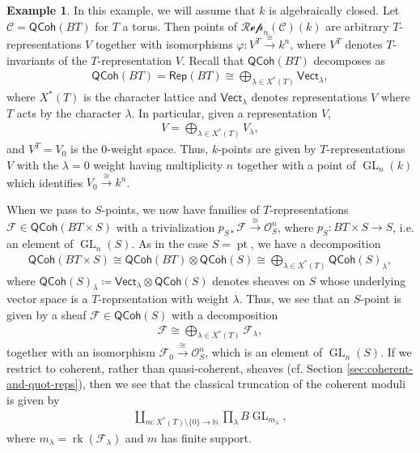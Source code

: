 \documentclass{article}
\numberwithin{equation}{section}
\theoremstyle{quest}
\theoremstyle{definition}
\newtheorem{ex}[thm]{Example}
\theoremstyle{remark}
\DeclareMathOperator{\GL}{GL}
\DeclareMathOperator{\rk}{rk}
\DeclareMathOperator{\pt}{pt}
\begin{document}
\begin{ex}
	In this example, we will assume that $k$ is algebraically closed. Let $\mathcal{C}=\mathsf{QCoh}(BT)$ for $T$ a torus. Then points of $\mathscr{Rep}_n(\mathcal{C})(k)$ are arbitrary $T$-representations $V$ together with isomorphisms $\varphi:V^T\xrightarrow{\cong}k^n$, where $V^T$ denotes $T$-invariants of the $T$-representation $V$. Recall that $\mathsf{QCoh}(BT)$ decomposes as
	\begin{align*}
		\mathsf{QCoh}(BT)=\mathsf{Rep}(BT)\cong \bigoplus _{\lambda\in X^*(T)}\mathsf{Vect}_{\lambda},
	\end{align*} 
	where $X^*(T)$ is the character lattice and $\mathsf{Vect}_{\lambda}$ denotes representations $V$ where $T$ acts by the character $\lambda$. In particular, given a representation $V$,
	\begin{align*}
		V=\bigoplus _{\lambda\in X^*(T)}V_\lambda,
	\end{align*} 
	and $V^T=V_0$ is the 0-weight space. Thus, $k$-points are given by $T$-representations $V$ with the $\lambda=0$ weight having multiplicity $n$ together with a point of $\GL_n(k)$ which identifies $V_0\xrightarrow{\cong} k^n$.

	When we pass to $S$-points, we now have families of $T$-representations $\mathscr{F}\in \mathsf{QCoh}(BT\times S)$ with a trivialization $p_{S*}\mathscr{F}\xrightarrow{\cong}\mathscr{O}^n_S$, where $p_S:BT\times S\to S$, i.e. an element of $\GL_n(S)$. As in the case $S=\pt$, we have a decomposition
	\begin{align*}
		\mathsf{QCoh}(BT\times S)\cong\mathsf{QCoh}(BT)\otimes \mathsf{QCoh}(S)\cong \bigoplus _{\lambda\in X^*(T)}\mathsf{QCoh}(S)_\lambda,
	\end{align*} 
	where $\mathsf{QCoh}(S)_\lambda\coloneqq \mathsf{Vect}_\lambda\otimes \mathsf{QCoh}(S)$ denotes sheaves on $S$ whose underlying vector space is a $T$-reprsentation with weight $\lambda$. Thus, we see that an $S$-point is given by a sheaf $\mathscr{F}\in \mathsf{QCoh}(S)$ with a decomposition
	\begin{align*}
		\mathscr{F}\cong \bigoplus _{\lambda\in X^*(T)}\mathscr{F}_\lambda,
	\end{align*} 
	together with an isomorphism $\mathscr{F}_0\xrightarrow{\cong}\mathscr{O}^n_{S}$, which is an element of $\GL_n(S)$. If we restrict to coherent, rather than quasi-coherent, sheaves (cf. Section \ref{sec:coherent-and-quot-reps}), then we see that the classical truncation of the coherent moduli is given by
	\begin{align*}
		\coprod_{m:X^*(T)\setminus \{0\} \to \mathbb{N} }\prod_{\lambda }B\GL_{m_{\lambda}},
	\end{align*} 
	where $m_\lambda=\rk(\mathscr{F}_\lambda)$ and $m$ has finite support.
\end{ex} 
\end{document}
